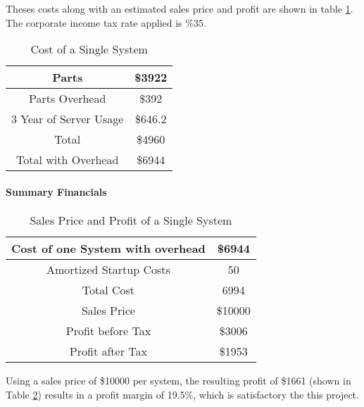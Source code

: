 \documentclass[PPFS.tex]{template/subfiles}
\begin{document}
        Theses costs along with an estimated sales price and profit are shown in table \ref{tab:prodTotalCosts}. The corporate income tax rate applied is \%35.
        
        \begin{table}[H]
        	\begin{center}
        		\caption{Cost of a Single System}
        		\label{tab:prodTotalCosts}
        		\begin{tabular}{|c|c|}
        			\hline
        			Parts & \$3922\\
        			\hline
        			Parts Overhead & \$392\\
        			\hline
        			3 Year of Server Usage & \$646.2\\
        			\hline
        			Total & \$4960\\
        			\hline
        			Total with Overhead & \$6944\\
        			\hline
        		\end{tabular}
        	\end{center}
        \end{table}
        
        \paragraph{Summary Financials}
        
		\begin{table}[H]
			\begin{center}
				\caption{Sales Price and Profit of a Single System}
				\label{tab:SalesPrice}
				\begin{tabular}{|c|c|}
					\hline
					Cost of one System with overhead & \$6944\\
					\hline
					Amortized Startup Costs & 50\\
					\hline
					Total Cost & 6994\\
					\hline
					Sales Price & \$10000\\
					\hline
					Profit before Tax& \$3006\\
					\hline
					Profit after Tax& \$1953\\
					\hline
				\end{tabular}
			\end{center}
		\end{table}
        
        Using a sales price of \$10000 per system, the resulting profit of \$1661 (shown in Table \ref{tab:SalesPrice}) results in a profit margin of 19.5\%, which is satisfactory the this project.
        
        
\end{document}
